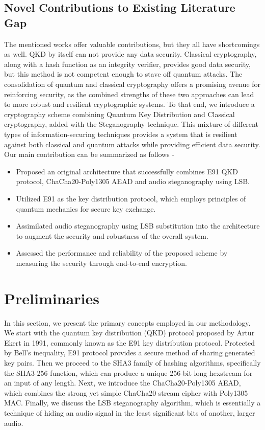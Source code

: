 \documentclass[a4paper]{cas-sc}
\begin{document}
\subsection{Novel Contributions to Existing Literature Gap}
The mentioned works offer valuable contributions, but they all have shortcomings as well. QKD by itself can not
provide any data security. Classical cryptography, along with a hash function as an integrity verifier, provides good data
security, but this method is not competent enough to stave off quantum attacks. The consolidation of quantum
and classical cryptography offers a promising avenue for reinforcing security, as the combined strengths of these two
approaches can lead to more robust and resilient cryptographic systems. To that end, we introduce a cryptography
scheme combining Quantum Key Distribution and Classical cryptography, added with the Steganography technique. This
mixture of different types of information-securing techniques provides a system that is resilient against both classical
and quantum attacks while providing efficient data security.   Our main contribution can be summarized as follows -
\begin{itemize}
    \item Proposed an original architecture that successfully combines E91 QKD protocol, ChaCha20-Poly1305 AEAD and audio steganography using LSB.
    \item Utilized E91 as the key distribution protocol, which employs principles of quantum mechanics for secure key exchange.
    \item Assimilated audio steganography using LSB substitution into the architecture to augment the security and robustness of the overall system.
    \item Assessed the performance and reliability of the proposed scheme by measuring the security through end-to-end encryption.
\end{itemize}
\section{Preliminaries}
\label{sec:preliminaries}
In this section, we present the primary concepts employed in our methodology. We start with the quantum key distribution (QKD) protocol proposed by Artur Ekert in 1991, commonly known as the E91 key distribution protocol. Protected by Bell's inequality, E91 protocol provides a secure method of sharing generated key pairs. Then we proceed to the SHA3 family of hashing algorithms, specifically the SHA3-256 function, which can produce a unique 256-bit long hexstream for an input of any length. Next, we introduce the ChaCha20-Poly1305 AEAD, which combines the strong yet simple ChaCha20 stream cipher with Poly1305 MAC. Finally, we discuss the LSB steganography algorithm, which is essentially a technique of hiding an audio signal in the least significant bits of another, larger audio.
\end{document}
